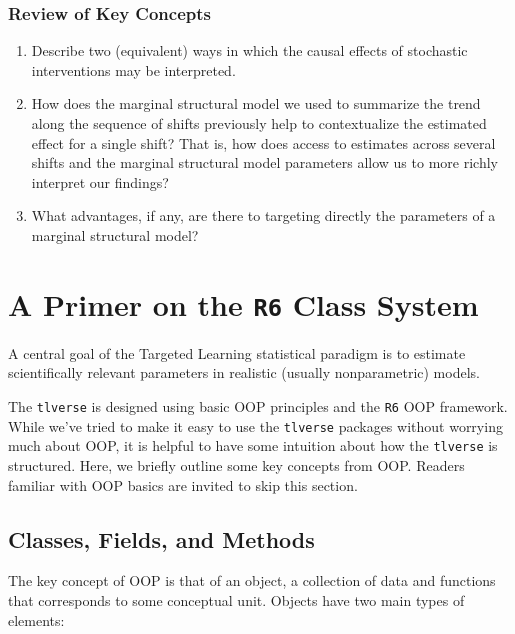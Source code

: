 \documentclass[12pt, krantz2,]{book}
\theoremstyle{definition}
\theoremstyle{definition}
\theoremstyle{definition}
\newcommand{\1}{\mathbbm{1}}
\begin{document}
\hypertarget{review-of-key-concepts-2}{%
\subsection{Review of Key Concepts}\label{review-of-key-concepts-2}}

\begin{enumerate}
\def\labelenumi{\arabic{enumi}.}
\item
  Describe two (equivalent) ways in which the causal effects of stochastic
  interventions may be interpreted.
\item
  How does the marginal structural model we used to summarize the trend along
  the sequence of shifts previously help to contextualize the estimated effect
  for a single shift? That is, how does access to estimates across several
  shifts and the marginal structural model parameters allow us to more richly
  interpret our findings?
\item
  What advantages, if any, are there to targeting directly the parameters of a
  marginal structural model?
\end{enumerate}

\hypertarget{r6}{%
\chapter{\texorpdfstring{A Primer on the \texttt{R6} Class System}{A Primer on the R6 Class System}}\label{r6}}

A central goal of the Targeted Learning statistical paradigm is to estimate
scientifically relevant parameters in realistic (usually nonparametric) models.

The \texttt{tlverse} is designed using basic OOP principles and the \texttt{R6} OOP framework.
While we've tried to make it easy to use the \texttt{tlverse} packages without worrying
much about OOP, it is helpful to have some intuition about how the \texttt{tlverse} is
structured. Here, we briefly outline some key concepts from OOP. Readers
familiar with OOP basics are invited to skip this section.

\hypertarget{classes-fields-and-methods}{%
\section{Classes, Fields, and Methods}\label{classes-fields-and-methods}}

The key concept of OOP is that of an object, a collection of data and functions
that corresponds to some conceptual unit. Objects have two main types of
elements:
\end{document}
